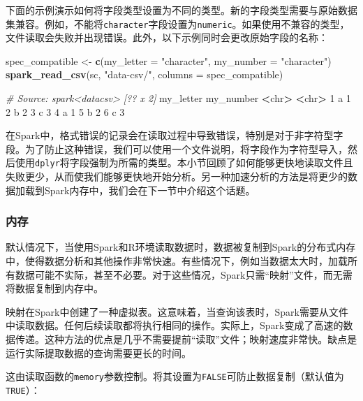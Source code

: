 \documentclass[
]{article}
\newenvironment{Shaded}{\begin{snugshade}}{\end{snugshade}}
\newcommand{\CommentTok}[1]{\textcolor[rgb]{0.56,0.35,0.01}{\textit{#1}}}
\newcommand{\DataTypeTok}[1]{\textcolor[rgb]{0.13,0.29,0.53}{#1}}
\newcommand{\DecValTok}[1]{\textcolor[rgb]{0.00,0.00,0.81}{#1}}
\newcommand{\ErrorTok}[1]{\textcolor[rgb]{0.64,0.00,0.00}{\textbf{#1}}}
\newcommand{\KeywordTok}[1]{\textcolor[rgb]{0.13,0.29,0.53}{\textbf{#1}}}
\newcommand{\NormalTok}[1]{#1}
\newcommand{\OperatorTok}[1]{\textcolor[rgb]{0.81,0.36,0.00}{\textbf{#1}}}
\newcommand{\StringTok}[1]{\textcolor[rgb]{0.31,0.60,0.02}{#1}}
\begin{document}
下面的示例演示如何将字段类型设置为不同的类型。新的字段类型需要与原始数据集兼容。例如，不能将\texttt{character}字段设置为\texttt{numeric}。如果使用不兼容的类型，文件读取会失败并出现错误。此外，以下示例同时会更改原始字段的名称：

\begin{Shaded}
\begin{Highlighting}[]
\NormalTok{spec_compatible <-}\StringTok{ }\KeywordTok{c}\NormalTok{(}\DataTypeTok{my_letter =} \StringTok{"character"}\NormalTok{, }\DataTypeTok{my_number =} \StringTok{"character"}\NormalTok{)}
\KeywordTok{spark_read_csv}\NormalTok{(sc, }\StringTok{"data-csv/"}\NormalTok{, }\DataTypeTok{columns =}\NormalTok{ spec_compatible)}

\CommentTok{# Source: spark<datacsv> [?? x 2]}
\NormalTok{ my_letter my_number}
 \OperatorTok{<}\NormalTok{chr}\OperatorTok{>}\StringTok{ }\ErrorTok{<}\NormalTok{chr}\OperatorTok{>}
\DecValTok{1}\NormalTok{ a }\DecValTok{1}
\DecValTok{2}\NormalTok{ b }\DecValTok{2}
\DecValTok{3}\NormalTok{ c }\DecValTok{3}
\DecValTok{4}\NormalTok{ a }\DecValTok{1}
\DecValTok{5}\NormalTok{ b }\DecValTok{2}
\DecValTok{6}\NormalTok{ c }\DecValTok{3}
\end{Highlighting}
\end{Shaded}

在Spark中，格式错误的记录会在读取过程中导致错误，特别是对于非字符型字段。为了防止这种错误，我们可以使用一个文件说明，将字段作为字符型导入，然后使用\texttt{dplyr}将字段强制为所需的类型。本小节回顾了如何能够更快地读取文件且失败更少，从而使我们能够更快地开始分析。另一种加速分析的方法是将更少的数据加载到Spark内存中，我们会在下一节中介绍这个话题。

\hypertarget{ux5185ux5b58}{%
\subsubsection{内存}\label{ux5185ux5b58}}

默认情况下，当使用Spark和R环境读取数据时，数据被复制到Spark的分布式内存中，使得数据分析和其他操作非常快速。有些情况下，例如当数据太大时，加载所有数据可能不实际，甚至不必要。对于这些情况，Spark只需``映射''文件，而无需将数据复制到内存中。

映射在Spark中创建了一种虚拟表。这意味着，当查询该表时，Spark需要从文件中读取数据。任何后续读取都将执行相同的操作。实际上，Spark变成了高速的数据传递。这种方法的优点是几乎不需要提前``读取''文件；映射速度非常快。缺点是运行实际提取数据的查询需要更长的时间。

这由读取函数的\texttt{memory}参数控制。将其设置为\texttt{FALSE}可防止数据复制（默认值为\texttt{TRUE}）：
\end{document}
